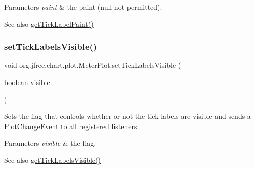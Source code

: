 \begin{DoxyParams}{Parameters}
{\em paint} & the paint ({\ttfamily null} not permitted).\\
\hline
\end{DoxyParams}
\begin{DoxySeeAlso}{See also}
\mbox{\hyperlink{classorg_1_1jfree_1_1chart_1_1plot_1_1_meter_plot_a3f1876a141990a24ca5d98e47dc9a245}{get\+Tick\+Label\+Paint()}} 
\end{DoxySeeAlso}
\mbox{\label{classorg_1_1jfree_1_1chart_1_1plot_1_1_meter_plot_ae3aee668c150efd7e0f7b0f748e4472e}} 
\subsubsection{\texorpdfstring{set\+Tick\+Labels\+Visible()}{setTickLabelsVisible()}}
{\footnotesize\ttfamily void org.\+jfree.\+chart.\+plot.\+Meter\+Plot.\+set\+Tick\+Labels\+Visible (\begin{DoxyParamCaption}\item[{boolean}]{visible }\end{DoxyParamCaption})}

Sets the flag that controls whether or not the tick labels are visible and sends a \mbox{\hyperlink{}{Plot\+Change\+Event}} to all registered listeners.


\begin{DoxyParams}{Parameters}
{\em visible} & the flag.\\
\hline
\end{DoxyParams}
\begin{DoxySeeAlso}{See also}
\mbox{\hyperlink{classorg_1_1jfree_1_1chart_1_1plot_1_1_meter_plot_a79cddb55aadd6e29195297e9246f495d}{get\+Tick\+Labels\+Visible()}} 
\end{DoxySeeAlso}
\mbox{\label{classorg_1_1jfree_1_1chart_1_1plot_1_1_meter_plot_a97ca193d5f4d6c1e4e291798b5b5ba74}} 
